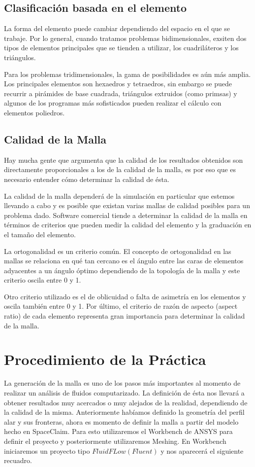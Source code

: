 \documentclass[12pt, letterpaper]{article}
\begin{document}
\subsection*{Clasificación basada en el elemento}
La forma del elemento puede cambiar dependiendo del espacio en el que se trabaje. Por lo general, cuando tratamos problemas bidimensionales, exsiten dos tipos de elementos principales que se tienden a utilizar, los cuadriláteros y los triángulos.

Para los problemas tridimensionales, la gama de posibilidades es aún más amplia. Los principales elementos son hexaedros y tetraedros, sin embargo se puede recurrir a pirámides de base cuadrada, triángulos extruidos (como primsas) y algunos de los programas más sofisticados pueden realizar el cálculo con elementos poliedros. 


\subsection*{Calidad de la Malla}

Hay mucha gente que argumenta que la calidad de los resultados obtenidos son directamente proporcionales a los de la calidad de la malla, es por eso que es necesario entender cómo determinar la calidad de ésta.

La calidad de la malla dependerá de la simulación en particular que estemos llevando a cabo y es posible que existan varias mallas de calidad posibles para un problema dado. Software comercial tiende a determinar la calidad de la malla en términos de criterios que pueden medir la calidad del elemento y la graduación en el tamaño del elemento.

La ortogonalidad es un criterio común. El concepto de ortogonalidad en las mallas se relaciona en qué tan cercano es el ángulo entre las caras de elementos adyacentes a un ángulo óptimo dependiendo de la topología de la malla y este criterio oscila entre 0 y 1.

Otro criterio utilizado es el de oblicuidad o falta de asimetría en los elementos y oscila también entre 0 y 1. Por último, el criterio de razón de aspecto (aspect ratio) de cada elemento representa gran importancia para determinar la calidad de la malla.


\section*{Procedimiento de la Práctica}

La generación de la malla es uno de los pasos más importantes al momento de realizar un análisis de fluidos computarizado. La definición de ésta nos llevará a obtener resultados muy acercados o muy alejados de la realidad, dependiendo de la calidad de la misma. Anteriormente habíamos definido la geometría del perfil alar y sus fronteras, ahora es momento de definir la malla a partir del modelo hecho en SpaceClaim. Para esto utilizaremos el Workbench de ANSYS para definir el proyecto y posteriormente utilizaremos Meshing. En Workbench iniciaremos un proyecto tipo $Fluid FLow (Fluent)$ y nos aparecerá el siguiente recuadro.
\end{document}
